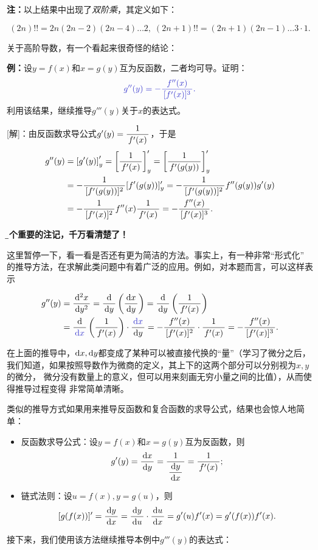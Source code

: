 {\bf 注：}以上结果中出现了{\it 双阶乘}，其定义如下：
\begin{thx}
	$$(2n)!!=2n(2n-2)(2n-4)\ldots2,\;(2n+1)!!=(2n+1)(2n-1)\ldots3\cdot1.$$
\end{thx}

关于高阶导数，有一个看起来很奇怪的结论：

{\bf 例：}设$y=f(x)$和$x=g(y)$互为反函数，二者均可导。证明：
$$\b g''(y)=-\df{f''(x)}{[f'(x)]^3}.$$
利用该结果，继续推导$g'''(y)$关于$x$的表达式。

[解]：由反函数求导公式$g'(y)=\displaystyle\frac{\,{1}\,}{\,{f'(x)}\,}$，于是
\begin{align*}
	g''(y)&=\left[g'(y)\right]'_y=\left[\displaystyle\frac{\,{1}\,}{\,{f'(x)}\,}\right]'_y
	=\left[\displaystyle\frac{\,{1}\,}{\,{f'(g(y))}\,}\right]'_y\\
	&=-\displaystyle\frac{\,{1}\,}{\,{[f'(g(y))]^2}\,}[f'(g(y))]'_y
	=-\displaystyle\frac{\,{1}\,}{\,{[f'(g(y))]^2}\,}f''(g(y))g'(y)\\
	&=-\displaystyle\frac{\,{1}\,}{\,{[f'(x)]^2}\,}f''(x)\displaystyle\frac{\,{1}\,}{\,{f'(x)}\,}
	=-\displaystyle\frac{\,{f''(x)}\,}{\,{[f'(x)]^3}\,}.
\end{align*}
\begin{shaded}
	{\bf\b 一个重要的注记，千万看清楚了！}
	
	这里暂停一下，看一看是否还有更为简洁的方法。事实上，有一种非常“形式化”
	的推导方法，在求解此类问题中有着广泛的应用。例如，对本题而言，可以这样表示
	\begin{tcolorbox}[colframe=red!80!black]
		\begin{align*}
			g''(y)&=\df{\d^2x}{\d y^2}
			=\df{\d }{\d y}\left(\df{\d x}{\d y}\right)
			=\df{\d }{\d y}\left(\df1{f'(x)}\right)\\
			&=\df{\d }{\b\d x}\left(\df1{f'(x)}\right)\cdot\df{\b\d x}{\d y}
			=-\df{f''(x)}{[f'(x)]^2}\cdot\df1{f'(x)}
			=-\df{f''(x)}{[f'(x)]^3}.
		\end{align*}
	\end{tcolorbox}
	在上面的推导中，$\mathrm{d} x,\mathrm{d} y$都变成了某种可以被直接代换的“量”（学习了微分之后，
	我们知道，如果按照导数作为微商的定义，其上下的这两个部分可以分别视为$x,y$的微分，
	微分没有数量上的意义，但可以用来刻画无穷小量之间的比值），从而使得推导过程变得
	非常简单清晰。
	
	类似的推导方式如果用来推导反函数和复合函数的求导公式，结果也会惊人地简单：
	\begin{itemize}
	  \item 反函数求导公式：设$y=f(x)$和$x=g(y)$互为反函数，则
	  $$g'(y)=\displaystyle\frac{\,{\mathrm{d} x}\,}{\,{\mathrm{d} y}\,}=\displaystyle\frac{\,{1}\,}{\,{\displaystyle\frac{\,{\mathrm{d} y}\,}{\,{\mathrm{d} x}\,}}\,}=\displaystyle\frac{\,{1}\,}{\,{f'(x)}\,};$$
	  \item 链式法则：设$u=f(x),y=g(u)$，则
	  $$[g(f(x))]'=\displaystyle\frac{\,{\mathrm{d} y}\,}{\,{\mathrm{d} x}\,}
	  =\displaystyle\frac{\,{\mathrm{d} y}\,}{\,{\mathrm{d} u}\,}\cdot \displaystyle\frac{\,{\mathrm{d} u}\,}{\,{\mathrm{d} x}\,}
	  =g'(u)f'(x)=g'(f(x))f'(x).$$
	\end{itemize}
	
	接下来，我们使用该方法继续推导本例中$g'''(y)$的表达式：
\end{shaded}

